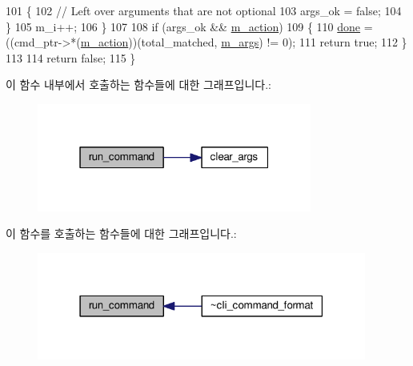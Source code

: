 \begin{DoxyCode}
101         \{
102             \textcolor{comment}{// Left over arguments that are not optional}
103             args\_ok = \textcolor{keyword}{false};
104         \}
105         m\_i++;
106     \}
107 
108     \textcolor{keywordflow}{if} (args\_ok && \hyperlink{classcli__command__format_a916e0e89f5ab664eb3cbcc7c2401a0df}{m\_action})
109     \{
110         \hyperlink{mrp_validate_8c_a5992b274cfdcacdbc1fa8347fd01ebde}{done} = ((cmd\_ptr->*(\hyperlink{classcli__command__format_a916e0e89f5ab664eb3cbcc7c2401a0df}{m\_action}))(total\_matched, \hyperlink{classcli__command__format_a5a62a08dfd884e04cb69fa9427ff060c}{m\_args}) != 0);
111         \textcolor{keywordflow}{return} \textcolor{keyword}{true};
112     \}
113 
114     \textcolor{keywordflow}{return} \textcolor{keyword}{false};
115 \}
\end{DoxyCode}


이 함수 내부에서 호출하는 함수들에 대한 그래프입니다.\+:
\nopagebreak
\begin{figure}[H]
\begin{center}
\leavevmode
\includegraphics[width=256pt]{classcli__command__format_a4ca4ef77ff12c0970259279f5fcf488a_cgraph}
\end{center}
\end{figure}




이 함수를 호출하는 함수들에 대한 그래프입니다.\+:
\nopagebreak
\begin{figure}[H]
\begin{center}
\leavevmode
\includegraphics[width=307pt]{classcli__command__format_a4ca4ef77ff12c0970259279f5fcf488a_icgraph}
\end{center}
\end{figure}




